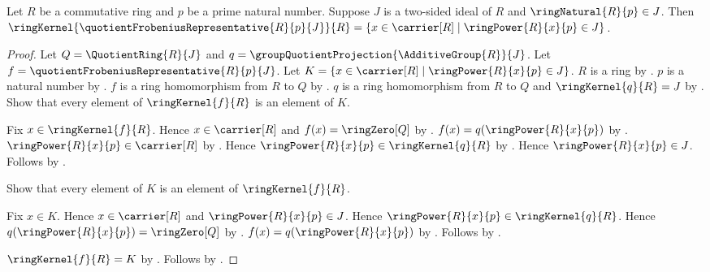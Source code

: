 \begin{theorem}\label{quotient_frobenius_representative_kernel}
    Let $R$ be a commutative ring and $p$ be a prime natural number.
    Suppose $J$ is a two-sided ideal of $R$ and
        $\ringNatural{R}{p}\in J$.
    Then
        $\ringKernel{\quotientFrobeniusRepresentative{R}{p}{J}}{R}
            =\{x\in\carrier[R]\mid
                \ringPower{R}{x}{p}\in J\}$.
\end{theorem}
\begin{proof}
    Let $Q=\QuotientRing{R}{J}$ and
        $q=\groupQuotientProjection{\AdditiveGroup{R}}{J}$.
    Let $f=\quotientFrobeniusRepresentative{R}{p}{J}$.
    Let $K=\{x\in\carrier[R]\mid\ringPower{R}{x}{p}\in J\}$.
    $R$ is a ring by .
    $p$ is a natural number by .
    $f$ is a ring homomorphism from $R$ to $Q$ by
        .
    $q$ is a ring homomorphism from $R$ to $Q$ and
        $\ringKernel{q}{R}=J$ by
        .
    Show that every element of $\ringKernel{f}{R}$ is an element of $K$.
    \begin{subproof}
        Fix $x\in\ringKernel{f}{R}$.
        Hence $x\in\carrier[R]$ and $f(x)=\ringZero[Q]$ by
            .
        $f(x)=q(\ringPower{R}{x}{p})$ by
            .
        $\ringPower{R}{x}{p}\in\carrier[R]$ by
            .
        Hence $\ringPower{R}{x}{p}\in\ringKernel{q}{R}$ by
            .
        Hence $\ringPower{R}{x}{p}\in J$.
        Follows by \auto.
    \end{subproof}
    Show that every element of $K$ is an element of $\ringKernel{f}{R}$.
    \begin{subproof}
        Fix $x\in K$.
        Hence $x\in\carrier[R]$ and $\ringPower{R}{x}{p}\in J$.
        Hence $\ringPower{R}{x}{p}\in\ringKernel{q}{R}$.
        Hence $q(\ringPower{R}{x}{p})=\ringZero[Q]$ by
            .
        $f(x)=q(\ringPower{R}{x}{p})$ by
            .
        Follows by .
    \end{subproof}
    $\ringKernel{f}{R}=K$ by .
    Follows by \auto.
\end{proof}

